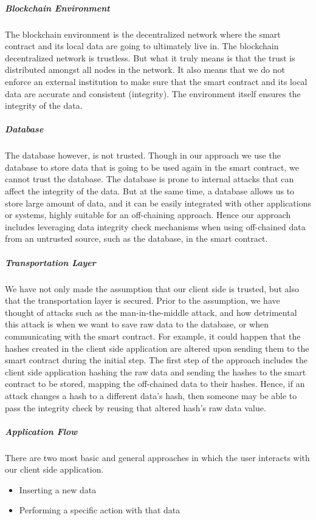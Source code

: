 \subparagraph{Blockchain Environment}
The blockchain environment is the decentralized network where the smart contract and its local data are going to ultimately live in. The blockchain decentralized network is trustless. But what it truly means is that the trust is distributed amongst all nodes in the network. It also means that we do not enforce an external institution to make sure that the smart contract and its local data are accurate and consistent (integrity). The environment itself ensures the integrity of the data.

\subparagraph{Database}
The database however, is not trusted. Though in our approach we use the database to store data that is going to be used again in the smart contract, we cannot trust the database. The database is prone to internal attacks that can affect the integrity of the data. But at the same time, a database allows us to store large amount of data, and it can be easily integrated with other applications or systems, highly suitable for an off-chaining approach. Hence our approach includes leveraging data integrity check mechanisms when using off-chained data from an untrusted source, such as the database, in the smart contract.

\subparagraph{Transportation Layer}
We have not only made the assumption that our client side is trusted, but also that the transportation layer is secured. Prior to the assumption, we have thought of attacks such as the man-in-the-middle attack, and how detrimental this attack is when we want to save raw data to the database, or when communicating with the smart contract. For example, it could happen that the hashes created in the client side application are altered upon sending them to the smart contract during the initial step. The first step of the approach includes the client side application hashing the raw data and sending the hashes to the smart contract to be stored, mapping the off-chained data to their hashes. Hence, if an attack changes a hash to a different data’s hash, then someone may be able to pass the integrity check by reusing that altered hash’s raw data value.

\subparagraph{Application Flow}
There are two most basic and general approaches in which the user interacts with our client side application. 

\begin{itemize}
\item Inserting a new data
\item Performing a specific action with that data
\end{itemize}

